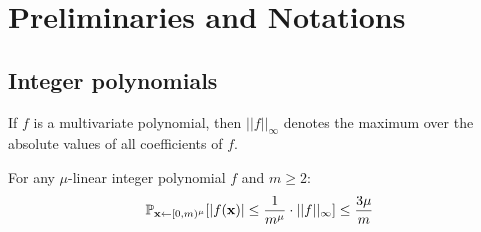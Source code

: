 \section{Preliminaries and Notations}
\label{appendix:prelimns}
\subsection{Integer polynomials} If $f$ is a multivariate polynomial, then $||f||_\infty$ denotes the maximum over the absolute values of all coefficients of $f$. 

\begin{lemma}\label{lem:evalbound} For any $\mu$-linear integer polynomial $f$ and $m \geq 2$:
 $$\mathbb{P}_{\mathbf{x} \gets [0,m)^\mu} [|f(\mathbf{x})|\leq \frac{1}{m^\mu} \cdot ||f||_\infty]\leq \frac{3\mu}{m}$$
 \end{lemma} 

